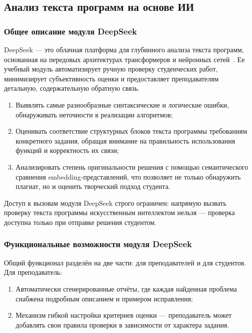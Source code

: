 \subsection{Анализ текста программ на основе ИИ}

\subsubsection{Общее описание модуля DeepSeek}

DeepSeek —  это облачная платформа для глубинного анализа текста программ, основанная на передовых архитектурах трансформеров и нейронных сетей~\cite{deepseek_docs}. Ее учебный модуль автоматизирует ручную проверку студенческих работ, минимизирует субъективность оценки и предоставляет преподавателям детальную, содержательную обратную связь.

\begin{enumerate}
  \item Выявлять самые разнообразные синтаксические и логические ошибки, обнаруживать неточности в реализации алгоритмов;
  \item Оценивать соответствие структурных блоков текста программы требованиям конкретного задания, обращая внимание на правильность использования функций и корректность их связи;
  \item Анализировать степень оригинальности решения с помощью семантического сравнения embedding‐представлений, что позволяет не только обнаружить плагиат, но и оценить творческий подход студента.
\end{enumerate}

Доступ к вызовам модуля DeepSeek строго ограничен: напрямую вызвать проверку текста программы искусственным интеллектом нельзя --- проверка доступна только при отправке решения студентом.

\subsubsection{Функциональные возможности модуля DeepSeek}

Общий функционал разделён на две части: для преподавателей и для студентов. Для преподаватель:

\begin{enumerate}
    \item Автоматически сгенерированные отчёты, где каждая найденная проблема снабжена подробным описанием и примером исправления;
    \item Механизм гибкой настройки критериев оценки — преподаватель может добавлять свои правила проверки в зависимости от характера задания.
\end{enumerate}

